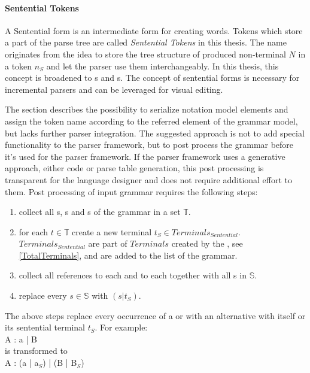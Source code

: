 \paragraph{Sentential Tokens} \label{SententialTokens}
A Sentential form is an intermediate form for creating words. Tokens which store a part of the parse tree are called \emph{Sentential Tokens} in this thesis. The name originates from the idea to store the tree structure of produced non-terminal $N$ in a token $n_S$ and let the parser use them interchangeably. In this thesis, this concept is broadened to s and s. The concept of sentential forms is necessary for incremental parsers and can be leveraged for visual editing.
 
The   section describes the possibility to serialize notation model elements and assign the token name according to the referred element of the grammar model, but lacks further parser integration. The suggested approach is not to add special functionality to the parser framework, but to post process the grammar before it's used for the parser framework. If the parser framework uses a generative approach, either code or parse table generation, this post processing is transparent for the language designer and does not require additional effort to them. 
Post processing of input grammar requires the following steps:
\begin{enumerate}
	\item collect all s, s and s of the grammar in a set $\mathbb{T}$.
	\item for each $t \in \mathbb{T}$ create a new terminal $t_S \in Terminals_{Sentential}$.\\ $Terminals_{Sentential}$ are part of $Terminals$ created by the , see \ref{TotalTerminals}, and are added to the  list of the grammar.
	\item collect all references to each  and to each  together with all s in $\mathbb{S}$.
	\item replace every $s \in \mathbb{S}$ with $(s | t_S)$. \label{SententialTokenSubstitution}
\end{enumerate}
  
The above steps replace every occurrence of a  or  with an alternative with itself or its sentential terminal $t_S$. 
For example:\\
A : a | B \\
is transformed to  \\
A : (a | a$_S$) | (B | B$_S$)

